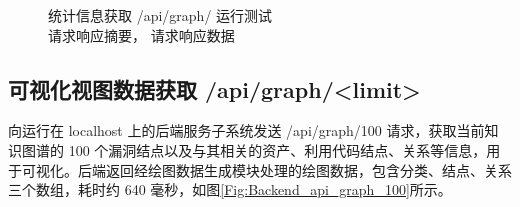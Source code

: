 \documentclass[a4paper,AutoFakeBold,oneside,12pt]{book}
\begin{document}


\begin{figure}[!htbp]
	\centering
	\quad %
	\caption{统计信息获取 /api/graph/ 运行测试\\ \protect{} 请求响应摘要，\protect{} 请求响应数据}
	\label{Fig:Backend_api_graph}
\end{figure}

\subsection{可视化视图数据获取 /api/graph/<limit>}

向运行在 localhost 上的后端服务子系统发送 /api/graph/100 请求，获取当前知识图谱的 100 个漏洞结点以及与其相关的资产、利用代码结点、关系等信息，用于可视化。后端返回经绘图数据生成模块处理的绘图数据，包含分类、结点、关系三个数组，耗时约 640 毫秒，如图\ref{Fig:Backend_api_graph_100}所示。
\end{document}
